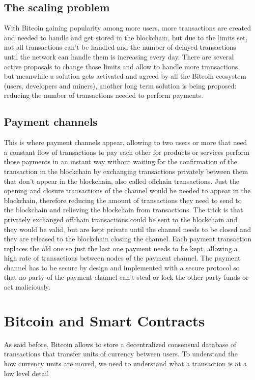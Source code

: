 \documentclass[12pt,journal,compsoc]{IEEEtran}
\begin{document}
\subsection{The scaling problem}
With Bitcoin gaining popularity among more users, more transactions are created and needed to handle and get stored in the blockchain, but due to the limits set, not all transactions can't be handled and the number of delayed transactions until the network can handle them is increasing every day. There are several active proposals\cite{segwit-org:online,bitcoin-unlimited:online} to change those limits and allow to handle more transactions, but meanwhile a solution gets activated and agreed by all the Bitcoin ecosystem (users, developers and miners), another long term solution is being proposed: reducing the number of transactions needed to perform payments.
\subsection{Payment channels}
This is where payment channels appear\cite{bitcoin-wiki-payment-channels:online}, allowing to two users or more that need a constant flow of transactions to pay each other for products or services perform those payments in an instant way without waiting for the confirmation of the transaction in the blockchain by exchanging transactions privately between them that don't appear in the blockchain, also called offchain transactions. Just the opening and closure transactions of the channel would be needed to appear in the blockchain, therefore reducing the amount of transactions they need to send to the blockchain and relieving the blockchain from transactions. The trick is that privately exchanged offchain transactions could be sent to the blockchain and they would be valid, but are kept private until the channel needs to be closed and they are released to the blockchain closing the channel. Each payment transaction replaces the old one so just the last one payment needs to be kept, allowing a high rate of transactions between nodes of the payment channel. The payment channel has to be secure by design and implemented with a secure protocol so that no party of the payment channel can't steal or lock the other party funds or act maliciously.

\section{Bitcoin and Smart Contracts}
As said before, Bitcoin allows to store a decentralized consensual database of transactions that transfer units of currency between users. To understand the how currency units are moved, we need to understand what a transaction is at a low level detail
\end{document}
